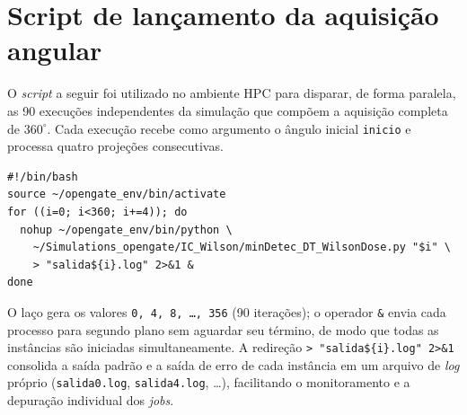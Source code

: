 
\chapter{Script de lançamento da aquisição angular}
\label{ap:lancador}

O \textit{script} a seguir foi utilizado no ambiente HPC para disparar, de forma
paralela, as 90 execuções independentes da simulação que compõem a aquisição
completa de $360^\circ$. Cada execução recebe como argumento o ângulo inicial
\texttt{inicio} e processa quatro projeções consecutivas.

\begin{lstlisting}[style=shell,caption={Lançador em \textit{shell} das 90
instâncias paralelas da simulação (passo angular de $4^\circ$, $n=4$ projeções
por instância).},label={lst:lancador}]
#!/bin/bash
source ~/opengate_env/bin/activate
for ((i=0; i<360; i+=4)); do
  nohup ~/opengate_env/bin/python \
    ~/Simulations_opengate/IC_Wilson/minDetec_DT_WilsonDose.py "$i" \
    > "salida${i}.log" 2>&1 &
done
\end{lstlisting}

\noindent
O laço gera os valores \texttt{0, 4, 8, \dots, 356} (90 iterações); o operador
\texttt{\&} envia cada processo para segundo plano sem aguardar seu término,
de modo que todas as instâncias são iniciadas simultaneamente. A redireção
\texttt{> "salida\$\{i\}.log" 2>\&1} consolida a saída padrão e a saída de erro
de cada instância em um arquivo de \textit{log} próprio
(\texttt{salida0.log}, \texttt{salida4.log}, \dots), facilitando o
monitoramento e a depuração individual dos \textit{jobs}.

